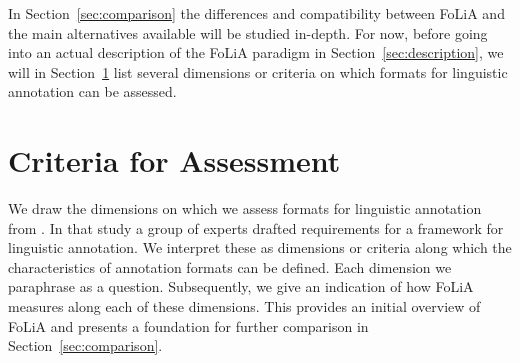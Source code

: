 \documentclass[a4paper,10pt,twoside]{article}
\begin{document}
In Section~\ref{sec:comparison} the differences and compatibility between FoLiA
and the main alternatives available will be studied in-depth. For now, before
going into an actual description of the FoLiA paradigm in
Section~\ref{sec:description}, we will in Section~\ref{sec:criteria} list
several dimensions or criteria on which formats for linguistic annotation can
be assessed.

\section{Criteria for Assessment}
\label{sec:criteria}

We draw the dimensions on which we assess formats for linguistic annotation
from . In that study a group of experts drafted requirements
for a framework for linguistic annotation. We interpret these as dimensions or
criteria along which the characteristics of annotation formats can be defined.
Each dimension we paraphrase as a question. Subsequently, we give an indication
of how FoLiA measures along each of these dimensions. This provides an initial
overview of FoLiA and presents a foundation for further comparison in
Section~\ref{sec:comparison}.
\end{document}
